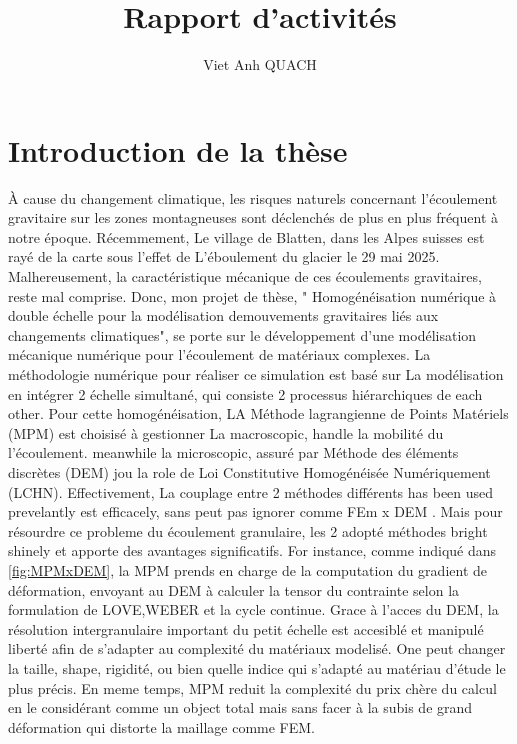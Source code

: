 \documentclass[a4paper,12pt]{report}
\title{Rapport d'activités}
\author{Viet Anh QUACH}
\begin{document}
\maketitle
\tableofcontents

\setcounter{secnumdepth}{4}

\chapter{Introduction de la thèse}
% 
À cause du changement climatique, les risques naturels concernant l'écoulement gravitaire sur les zones montagneuses sont déclenchés de plus en plus fréquent à notre époque. 
Récemmement, Le village de Blatten, dans les Alpes suisses est rayé de la carte sous l'effet de L’éboulement du glacier le 29 mai 2025. 
Malhereusement, la caractéristique mécanique de ces écoulements gravitaires, reste mal comprise. 
Donc, mon projet de thèse, " Homogénéisation numérique à double échelle pour la modélisation demouvements gravitaires liés aux changements climatiques", se porte sur le développement d'une modélisation mécanique numérique pour l’écoulement de matériaux complexes. 
La méthodologie numérique pour réaliser ce simulation est basé sur La modélisation en intégrer 2 échelle simultané, qui consiste 2 processus hiérarchiques de each other. 
Pour cette homogénéisation, LA Méthode lagrangienne de Points Matériels (MPM) est choisisé à gestionner  La macroscopic, handle la mobilité du l'écoulement. 
meanwhile la microscopic, assuré par Méthode des éléments discrètes (DEM) jou la role de Loi Constitutive Homogénéisée Numériquement (LCHN).
Effectivement, La couplage entre 2 méthodes différents has been used prevelantly est efficacely, sans peut pas ignorer comme FEm x DEM \cite{nguyen2013modelisation}. Mais pour résourdre ce probleme du écoulement granulaire, les 2 adopté méthodes bright shinely et apporte des avantages significatifs.
For instance, comme indiqué dans \autoref{fig:MPMxDEM}, la MPM prends en charge de la computation du gradient de déformation, envoyant au DEM à calculer la tensor du contrainte selon la formulation de LOVE,WEBER et la cycle continue. 
Grace à l'acces du DEM, la résolution intergranulaire important du petit échelle est accesiblé et manipulé liberté afin de s'adapter au complexité du matériaux modelisé. 
One peut changer la taille, shape, rigidité, ou bien quelle indice qui s'adapté au matériau d'étude le plus précis. 
En meme temps, MPM reduit la complexité du prix chère du calcul en le considérant comme un object total mais sans facer à la subis de grand déformation qui distorte la maillage comme FEM.
\end{document}
